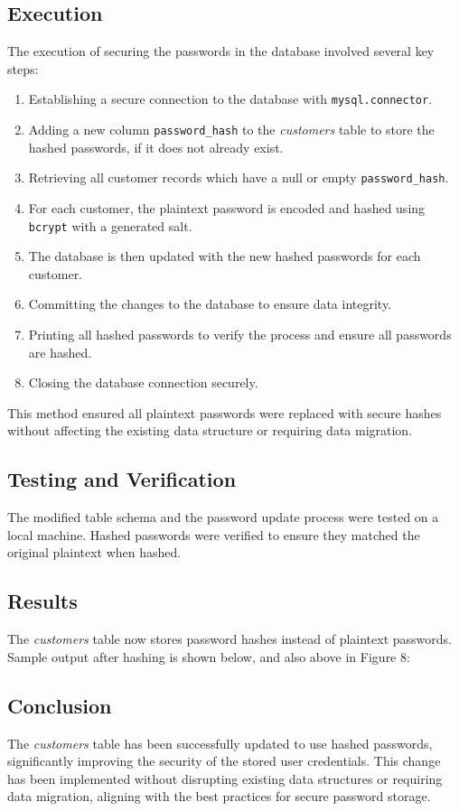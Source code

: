 \documentclass{article}
\begin{document}
\subsection{Execution}
The execution of securing the passwords in the database involved several key steps:
\begin{enumerate}
    \item Establishing a secure connection to the database with \texttt{mysql.connector}.
    \item Adding a new column \texttt{password\_hash} to the \textit{customers} table to store the hashed passwords, if it does not already exist.
    \item Retrieving all customer records which have a null or empty \texttt{password\_hash}.
    \item For each customer, the plaintext password is encoded and hashed using \texttt{bcrypt} with a generated salt.
    \item The database is then updated with the new hashed passwords for each customer.
    \item Committing the changes to the database to ensure data integrity.
    \item Printing all hashed passwords to verify the process and ensure all passwords are hashed.
    \item Closing the database connection securely.
\end{enumerate}
This method ensured all plaintext passwords were replaced with secure hashes without affecting the existing data structure or requiring data migration.

\subsection*{Testing and Verification}
The modified table schema and the password update process were tested on a local machine. Hashed passwords were verified to ensure they matched the original plaintext when hashed.

\subsection*{Results}
The \textit{customers} table now stores password hashes instead of plaintext passwords. Sample output after hashing is shown below, and also above in Figure 8:



\subsection*{Conclusion}
The \textit{customers} table has been successfully updated to use hashed passwords, significantly improving the security of the stored user credentials. This change has been implemented without disrupting existing data structures or requiring data migration, aligning with the best practices for secure password storage.
\end{document}
